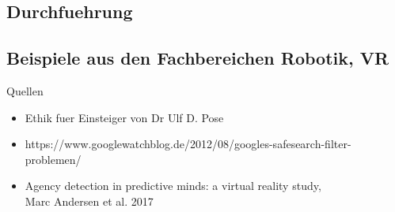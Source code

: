 \documentclass[10pt]{beamer}
\begin{document}
\subsection{Durchfuehrung}

\subsection{Beispiele aus den Fachbereichen Robotik, VR}






\begin{frame}{Quellen}
	\begin{itemize}
		\item Ethik fuer Einsteiger von Dr Ulf D. Pose
		\item https://www.googlewatchblog.de/2012/08/googles-safesearch-filter-problemen/
		\item Agency detection in predictive minds: a virtual reality study, \\ Marc Andersen et al. 2017
	\end{itemize}
	
\end{frame}
\end{document}

